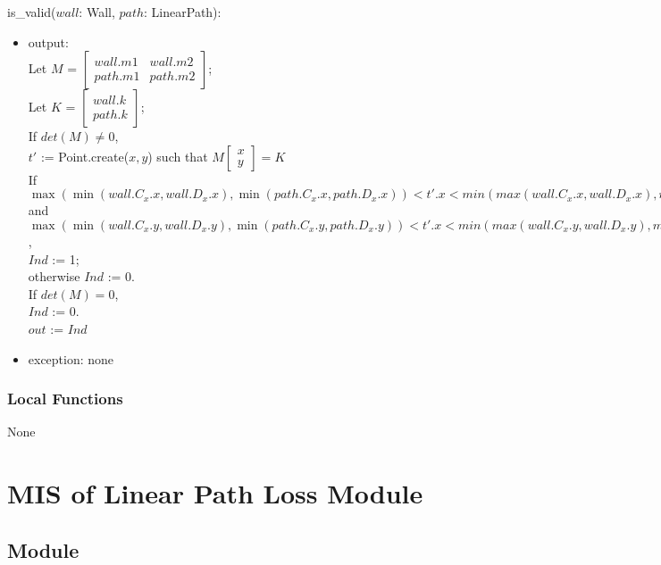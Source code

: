 \documentclass[12pt, titlepage]{article}
\begin{document}
\noindent is\_valid($wall$: Wall, $path$: LinearPath):
\begin{itemize}
\item output: \\
Let $M$ = 
$\begin{bmatrix}
wall.m1 & wall.m2\\
path.m1 & path.m2
\end{bmatrix}$;\\
Let $K$ = 
$\begin{bmatrix}
wall.k\\
path.k
\end{bmatrix}$;\\

If $det(M) \neq 0$, \\
$t'$ := Point.create($x, y$) such that $M
\begin{bmatrix}
x\\
y
\end{bmatrix} = K
$\\
If\\ 
$\max(\min(wall.C_x.x, wall.D_x.x),\min(path.C_x.x, path.D_x.x)) < t'.x < min(max(wall.C_x.x, wall.D_x.x),max(path.C_x.x, path.D_x.x))$\\
and\\ 
$\max(\min(wall.C_x.y, wall.D_x.y),\min(path.C_x.y, path.D_x.y)) < t'.x < min(max(wall.C_x.y, wall.D_x.y),max(path.C_x.y, path.D_x.y))$,\\
$Ind$ := 1;\\
otherwise $Ind$ := 0.\\
If $det(M) = 0$,\\
$Ind$ := 0.\\

$out$ := $Ind$
\item exception: none
\end{itemize}


\subsubsection{Local Functions} None



\newpage
\section{MIS of Linear Path Loss Module} \label{linearLossModule}

\subsection{Module}
\end{document}
